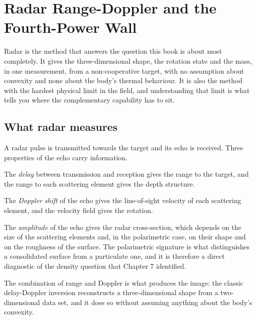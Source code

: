 
\chapter{Radar Range-Doppler and the Fourth-Power Wall}
\label{ch:radar}

Radar is the method that answers the question this book is about most
completely. It gives the three-dimensional shape, the rotation state and the
mass, in one measurement, from a non-cooperative target, with no assumption
about convexity and none about the body's thermal behaviour. It is also the
method with the hardest physical limit in the field, and understanding that
limit is what tells you where the complementary capability has to sit.

\section{What radar measures}

A radar pulse is transmitted towards the target and its echo is received.
Three properties of the echo carry information.

The \emph{delay} between transmission and reception gives the range to the
target, and the range to each scattering element gives the depth structure.

The \emph{Doppler shift} of the echo gives the line-of-sight velocity of
each scattering element, and the velocity field gives the rotation.

The \emph{amplitude} of the echo gives the radar cross-section, which
depends on the size of the scattering elements and, in the polarimetric
case, on their shape and on the roughness of the surface. The polarimetric
signature is what distinguishes a consolidated surface from a particulate
one, and it is therefore a direct diagnostic of the density question that
Chapter 7 identified.

The combination of range and Doppler is what produces the image: the classic
delay-Doppler inversion reconstructs a three-dimensional shape from a
two-dimensional data set, and it does so without assuming anything about the
body's convexity.

